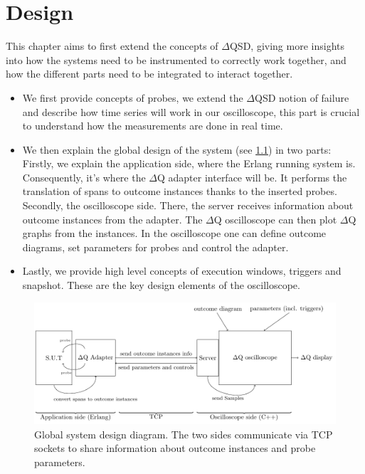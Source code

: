 \chapter{Design}
    This chapter aims to first extend the concepts of $\Delta$QSD, giving more insights into how the systems need to be instrumented to correctly work together, and how the different parts need to be integrated to interact together.
    \begin{itemize}
        \item We first provide concepts of probes, we extend the $\Delta$QSD notion of failure and describe how time series will work in our oscilloscope, this part is crucial to understand how the measurements are done in real time.
        \item We then explain the global design of the system (see \cref{fig:sys_diag}) in two parts: \\
            Firstly, we explain the application side, where the Erlang running system is. Consequently, it's where the $\Delta$Q adapter interface will be. It performs the translation of spans to outcome instances thanks to the inserted probes. \\
            Secondly, the oscilloscope side. There, the server receives information about outcome instances from the adapter. The $\Delta$Q oscilloscope can then plot $\Delta$Q graphs from the instances. In the oscilloscope one can define outcome diagrams, set parameters for probes and control the adapter.
        \item Lastly, we provide high level concepts of execution windows, triggers and snapshot. These are the key design elements of the oscilloscope. 
    \end{itemize}

    \begin{figure}[H]
        \begin{center}
            \includegraphics[scale = 0.8]{tikz/sut-stub-osc.pdf}
        \end{center}
        \caption{Global system design diagram. The two sides communicate via TCP sockets to share information about outcome instances and probe parameters.}
        \label{fig:sys_diag}
    \end{figure}

